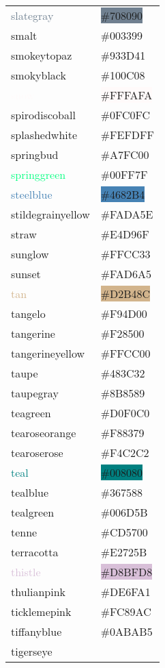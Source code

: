 \documentclass[
]{article}
\begin{document}
\begin{longtable}[]{@{}ll@{}}
\textcolor{slategray}{slategray} &
\colorbox{slategray}{\#708090}\tabularnewline
\textcolor{smalt}{smalt} &
\colorbox{darkpowderblue}{\#003399}\tabularnewline
\textcolor{smokeytopaz}{smokeytopaz} &
\colorbox{smokeytopaz}{\#933D41}\tabularnewline
\textcolor{smokyblack}{smokyblack} &
\colorbox{smokyblack}{\#100C08}\tabularnewline
\textcolor{snow}{snow} & \colorbox{snow}{\#FFFAFA}\tabularnewline
\textcolor{spirodiscoball}{spirodiscoball} &
\colorbox{spirodiscoball}{\#0FC0FC}\tabularnewline
\textcolor{splashedwhite}{splashedwhite} &
\colorbox{splashedwhite}{\#FEFDFF}\tabularnewline
\textcolor{springbud}{springbud} &
\colorbox{springbud}{\#A7FC00}\tabularnewline
\textcolor{springgreen}{springgreen} &
\colorbox{guppiegreen}{\#00FF7F}\tabularnewline
\textcolor{steelblue}{steelblue} &
\colorbox{steelblue}{\#4682B4}\tabularnewline
\textcolor{stildegrainyellow}{stildegrainyellow} &
\colorbox{jonquil}{\#FADA5E}\tabularnewline
\textcolor{straw}{straw} & \colorbox{straw}{\#E4D96F}\tabularnewline
\textcolor{sunglow}{sunglow} &
\colorbox{sunglow}{\#FFCC33}\tabularnewline
\textcolor{sunset}{sunset} &
\colorbox{deepchampagne}{\#FAD6A5}\tabularnewline
\textcolor{tan}{tan} & \colorbox{tan}{\#D2B48C}\tabularnewline
\textcolor{tangelo}{tangelo} &
\colorbox{tangelo}{\#F94D00}\tabularnewline
\textcolor{tangerine}{tangerine} &
\colorbox{tangerine}{\#F28500}\tabularnewline
\textcolor{tangerineyellow}{tangerineyellow} &
\colorbox{tangerineyellow}{\#FFCC00}\tabularnewline
\textcolor{taupe}{taupe} & \colorbox{darklava}{\#483C32}\tabularnewline
\textcolor{taupegray}{taupegray} &
\colorbox{taupegray}{\#8B8589}\tabularnewline
\textcolor{teagreen}{teagreen} &
\colorbox{teagreen}{\#D0F0C0}\tabularnewline
\textcolor{tearoseorange}{tearoseorange} &
\colorbox{coralpink}{\#F88379}\tabularnewline
\textcolor{tearoserose}{tearoserose} &
\colorbox{babypink}{\#F4C2C2}\tabularnewline
\textcolor{teal}{teal} & \colorbox{teal}{\#008080}\tabularnewline
\textcolor{tealblue}{tealblue} &
\colorbox{tealblue}{\#367588}\tabularnewline
\textcolor{tealgreen}{tealgreen} &
\colorbox{tealgreen}{\#006D5B}\tabularnewline
\textcolor{tenne}{tenne} & \colorbox{tenne}{\#CD5700}\tabularnewline
\textcolor{terracotta}{terracotta} &
\colorbox{terracotta}{\#E2725B}\tabularnewline
\textcolor{thistle}{thistle} &
\colorbox{thistle}{\#D8BFD8}\tabularnewline
\textcolor{thulianpink}{thulianpink} &
\colorbox{thulianpink}{\#DE6FA1}\tabularnewline
\textcolor{ticklemepink}{ticklemepink} &
\colorbox{ticklemepink}{\#FC89AC}\tabularnewline
\textcolor{tiffanyblue}{tiffanyblue} &
\colorbox{tiffanyblue}{\#0ABAB5}\tabularnewline
\textcolor{tigerseye}{tigerseye} &

\end{longtable}
\end{document}
